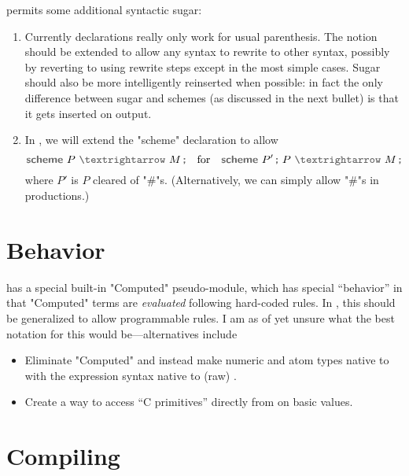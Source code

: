 \documentclass[11pt]{article} %
\begin{document}
 permits some additional syntactic sugar:
\begin{enumerate}

\item Currently  declarations really only work for usual parenthesis. The notion should be
  extended to allow any syntax to rewrite to other syntax, possibly by reverting to using rewrite
  steps except in the most simple cases. Sugar should also be more intelligently reinserted when
  possible: in fact the only difference between sugar and schemes (as discussed in the next bullet)
  is that it gets inserted on output.

\item In , we will extend the "scheme" declaration to allow
  \begin{displaymath}
    \kw{scheme}~P~\kw{$→$}~M\,\kw;  \quad\text{for}\quad
    \kw{scheme}~P'\,\kw; ~ P~\kw{$→$}~M\,\kw;
  \end{displaymath}
  where $P'$ is $P$ cleared of "#"s. (Alternatively, we can simply allow "#"s in productions.)

\end{enumerate}


\section{Behavior}\label{sec:behavior}

 has a special built-in "Computed" pseudo-module, which has special ``behavior'' in that
"Computed" terms are \emph{evaluated} following hard-coded rules. In , this should be
generalized to allow programmable rules.  I am as of yet unsure what the best notation for this
would be---alternatives include
\begin{itemize}

\item Eliminate "Computed" and instead make numeric and atom types native to \HAX with the
  expression syntax native to (raw) \HAX.

\item Create a way to access ``C primitives'' directly from \HAX on basic values.

\end{itemize}


\section{Compiling}\label{sec:compiling}
\end{document}
